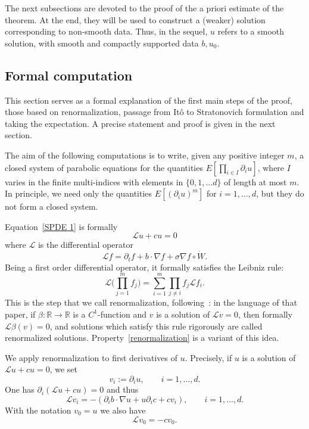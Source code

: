 \documentclass[a4paper,10pt]{article}
\begin{document}
The next subsections are devoted to the proof of the a priori estimate of the
theorem. At the end, they will be used to construct a (weaker) solution
corresponding to non-smooth data. Thus, in the sequel, $u$ refers to a smooth solution, with smooth and compactly supported data $b,u_{0}$.

\subsection{Formal computation}

This section serves as a formal explanation of the first main steps of the
proof, those based on renormalization, passage from It\^{o} to Stratonovich
formulation and taking the expectation. A precise statement and proof is given
in the next section. 

The aim of the following computations is to write, given any positive integer
$m$, a closed system of parabolic equations for the quantities $E[ \prod_{i\in I}\partial_{i}u]$, where $I$ varies in the finite multi-indices with elements in $\{0,1,\ldots d\}$ of length at most $m$. In principle, we need only the quantities $E[(\partial_{i}u)^{m}]
$ for $i=1,\ldots,d$, but they do not form a closed system.

Equation~\eqref{SPDE 1} is formally
\[
\mathcal{L}u+cu=0
\]
where $\mathcal{L}$ is the differential operator
\[
\mathcal{L}f=\partial_{t}f+b\cdot\nabla f+\sigma\nabla f\circ\dot{W}.
\]
Being a first order differential operator, it formally satisfies the Leibniz
rule:
\begin{equation}
\mathcal{L} \big(\prod_{j=1}^{m}f_{j}\big)  =\sum_{i=1}^{m}\prod_{j\neq
i}f_{j}\mathcal{L}f_{i}. \label{renormalization} 
\end{equation}
This is the step that we call renormalization, following~\cite{DIPELI89}: in the
language of that paper, if $\beta:\mathbb{R\rightarrow R}$ is a $C^{1}$-function and $v$ is a solution of $\mathcal{L}v=0$, then formally
$\mathcal{L}\beta(v)=0$, and solutions which satisfy this rule
rigorously are called renormalized solutions. Property~\eqref{renormalization}
is a variant of this idea.

We apply renormalization to first derivatives of $u$. Precisely, if $u$ is a
solution of $\mathcal{L}u+cu=0$, we set
\[
v_{i}:=\partial_{i}u,\qquad i=1,\ldots,d.
\]
One has $\partial_{i}(\mathcal{L}u+cu)  =0$ and thus
\[
\mathcal{L}v_{i}=-(\partial_{i}b\cdot\nabla u+u\partial_{i} 
c+cv_{i})  ,\qquad i=1,\ldots,d.
\]
With the notation $v_{0}=u$ we also have 
\[
\mathcal{L}v_{0}=-cv_{0}.
\]
\end{document}
